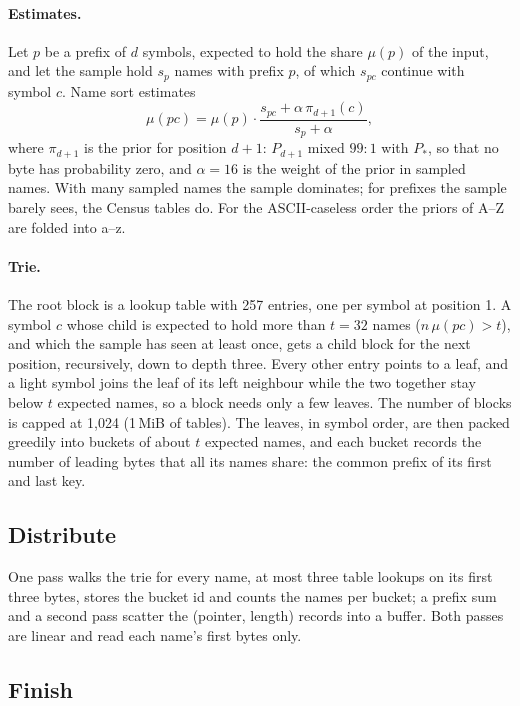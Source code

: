 \documentclass[11pt]{article}
\theoremstyle{definition}
\begin{document}
\paragraph{Estimates.} Let $p$ be a prefix of $d$ symbols, expected to hold
the share $\mu(p)$ of the input, and let the sample hold $s_p$ names with
prefix $p$, of which $s_{pc}$ continue with symbol $c$. Name sort estimates
\begin{equation}
\mu(pc) = \mu(p)\cdot\frac{s_{pc} + \alpha\,\pi_{d+1}(c)}{s_p + \alpha},
\end{equation}
where $\pi_{d+1}$ is the prior for position $d+1$: $P_{d+1}$ mixed $99:1$
with $P_\ast$, so that no byte has probability zero, and $\alpha = 16$ is the
weight of the prior in sampled names. With many sampled names the sample
dominates; for prefixes the sample barely sees, the Census tables do. For
the ASCII-caseless order the priors of A--Z are folded into a--z.

\paragraph{Trie.} The root block is a lookup table with 257 entries, one per
symbol at position 1. A symbol $c$ whose child is expected to hold more than
$t = 32$ names ($n\,\mu(pc) > t$), and which the sample has seen at least
once, gets a child block for the next position, recursively, down to depth
three. Every other entry points to a leaf, and a light symbol joins the leaf
of its left neighbour while the two together stay below $t$ expected names,
so a block needs only a few leaves. The number of blocks is capped at 1{,}024
(1\,MiB of tables). The leaves, in symbol order, are then packed greedily
into buckets of about $t$ expected names, and each bucket records the number
of leading bytes that all its names share: the common prefix of its first
and last key.

\subsection{Distribute}

One pass walks the trie for every name, at most three table lookups on its
first three bytes, stores the bucket id and counts the names per bucket; a
prefix sum and a second pass scatter the (pointer, length) records into a
buffer. Both passes are linear and read each name's first bytes only.

\subsection{Finish}
\end{document}
